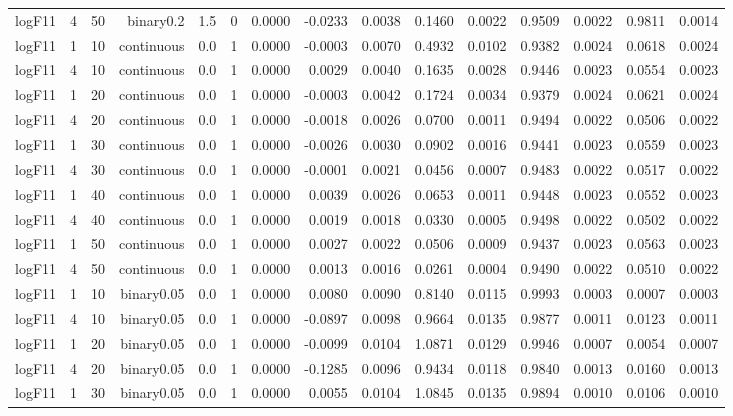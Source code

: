 \begin{longtable}{rrrrrrrrrrrrrrr}
  logF11 & 4 & 50 & binary0.2 & 1.5 & 0 & 0.0000 & -0.0233 & 0.0038 & 0.1460 & 0.0022 & 0.9509 & 0.0022 & 0.9811 & 0.0014 \\ 
  logF11 & 1 & 10 & continuous & 0.0 & 1 & 0.0000 & -0.0003 & 0.0070 & 0.4932 & 0.0102 & 0.9382 & 0.0024 & 0.0618 & 0.0024 \\ 
  logF11 & 4 & 10 & continuous & 0.0 & 1 & 0.0000 & 0.0029 & 0.0040 & 0.1635 & 0.0028 & 0.9446 & 0.0023 & 0.0554 & 0.0023 \\ 
  logF11 & 1 & 20 & continuous & 0.0 & 1 & 0.0000 & -0.0003 & 0.0042 & 0.1724 & 0.0034 & 0.9379 & 0.0024 & 0.0621 & 0.0024 \\ 
  logF11 & 4 & 20 & continuous & 0.0 & 1 & 0.0000 & -0.0018 & 0.0026 & 0.0700 & 0.0011 & 0.9494 & 0.0022 & 0.0506 & 0.0022 \\ 
  logF11 & 1 & 30 & continuous & 0.0 & 1 & 0.0000 & -0.0026 & 0.0030 & 0.0902 & 0.0016 & 0.9441 & 0.0023 & 0.0559 & 0.0023 \\ 
  logF11 & 4 & 30 & continuous & 0.0 & 1 & 0.0000 & -0.0001 & 0.0021 & 0.0456 & 0.0007 & 0.9483 & 0.0022 & 0.0517 & 0.0022 \\ 
  logF11 & 1 & 40 & continuous & 0.0 & 1 & 0.0000 & 0.0039 & 0.0026 & 0.0653 & 0.0011 & 0.9448 & 0.0023 & 0.0552 & 0.0023 \\ 
  logF11 & 4 & 40 & continuous & 0.0 & 1 & 0.0000 & 0.0019 & 0.0018 & 0.0330 & 0.0005 & 0.9498 & 0.0022 & 0.0502 & 0.0022 \\ 
  logF11 & 1 & 50 & continuous & 0.0 & 1 & 0.0000 & 0.0027 & 0.0022 & 0.0506 & 0.0009 & 0.9437 & 0.0023 & 0.0563 & 0.0023 \\ 
  logF11 & 4 & 50 & continuous & 0.0 & 1 & 0.0000 & 0.0013 & 0.0016 & 0.0261 & 0.0004 & 0.9490 & 0.0022 & 0.0510 & 0.0022 \\ 
  logF11 & 1 & 10 & binary0.05 & 0.0 & 1 & 0.0000 & 0.0080 & 0.0090 & 0.8140 & 0.0115 & 0.9993 & 0.0003 & 0.0007 & 0.0003 \\ 
  logF11 & 4 & 10 & binary0.05 & 0.0 & 1 & 0.0000 & -0.0897 & 0.0098 & 0.9664 & 0.0135 & 0.9877 & 0.0011 & 0.0123 & 0.0011 \\ 
  logF11 & 1 & 20 & binary0.05 & 0.0 & 1 & 0.0000 & -0.0099 & 0.0104 & 1.0871 & 0.0129 & 0.9946 & 0.0007 & 0.0054 & 0.0007 \\ 
  logF11 & 4 & 20 & binary0.05 & 0.0 & 1 & 0.0000 & -0.1285 & 0.0096 & 0.9434 & 0.0118 & 0.9840 & 0.0013 & 0.0160 & 0.0013 \\ 
  logF11 & 1 & 30 & binary0.05 & 0.0 & 1 & 0.0000 & 0.0055 & 0.0104 & 1.0845 & 0.0135 & 0.9894 & 0.0010 & 0.0106 & 0.0010 \\ 

\end{longtable}
